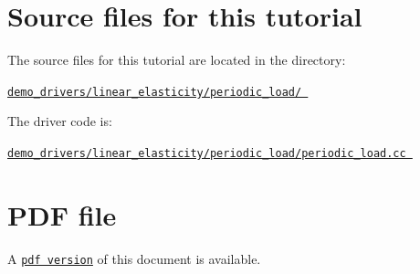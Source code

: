  

\hypertarget{index_sources}{}\section{Source files for this tutorial}\label{index_sources}

\begin{DoxyItemize}
\item The source files for this tutorial are located in the directory\+: \begin{center} \href{../../../../demo_drivers/linear_elasticity/periodic_load/}{\tt demo\+\_\+drivers/linear\+\_\+elasticity/periodic\+\_\+load/ } \end{center} 
\item The driver code is\+: \begin{center} \href{../../../../demo_drivers/linear_elasticity/periodic_load/periodic_load.cc}{\tt demo\+\_\+drivers/linear\+\_\+elasticity/periodic\+\_\+load/periodic\+\_\+load.\+cc } \end{center} 
\end{DoxyItemize}



 

 \hypertarget{index_pdf}{}\section{P\+D\+F file}\label{index_pdf}
A \href{../latex/refman.pdf}{\tt pdf version} of this document is available. 
